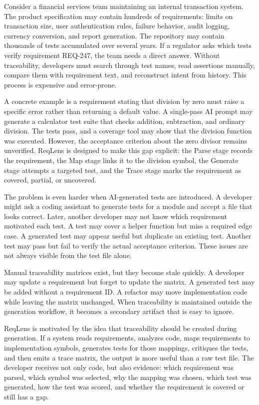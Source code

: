 \documentclass[conference]{IEEEtran}
\begin{document}
Consider a financial services team maintaining an internal transaction system.
The product specification may contain hundreds of requirements: limits on
transaction size, user authentication rules, failure behavior, audit logging,
currency conversion, and report generation. The repository may contain
thousands of tests accumulated over several years. If a regulator asks which
tests verify requirement REQ-247, the team needs a direct answer. Without
traceability, developers must search through test names, read assertions
manually, compare them with requirement text, and reconstruct intent from
history. This process is expensive and error-prone.

A concrete example is a requirement stating that division by zero must raise a
specific error rather than returning a default value. A single-pass AI prompt
may generate a calculator test suite that checks addition, subtraction, and
ordinary division. The tests pass, and a coverage tool may show that the
division function was executed. However, the acceptance criterion about the
zero divisor remains unverified. ReqLens is designed to make this gap explicit:
the Parse stage records the requirement, the Map stage links it to the
division symbol, the Generate stage attempts a targeted test, and the Trace
stage marks the requirement as covered, partial, or uncovered.

The problem is even harder when AI-generated tests are introduced. A developer
might ask a coding assistant to generate tests for a module and accept a file
that looks correct. Later, another developer may not know which requirement
motivated each test. A test may cover a helper function but miss a required
edge case. A generated test may appear useful but duplicate an existing test.
Another test may pass but fail to verify the actual acceptance criterion. These
issues are not always visible from the test file alone.

Manual traceability matrices exist, but they become stale quickly. A developer
may update a requirement but forget to update the matrix. A generated test may
be added without a requirement ID. A refactor may move implementation code while
leaving the matrix unchanged. When traceability is maintained outside the
generation workflow, it becomes a secondary artifact that is easy to ignore.

ReqLens is motivated by the idea that traceability should be created during
generation. If a system reads requirements, analyzes code, maps requirements to
implementation symbols, generates tests for those mappings, critiques the
tests, and then emits a trace matrix, the output is more useful than a raw test
file. The developer receives not only code, but also evidence: which
requirement was parsed, which symbol was selected, why the mapping was chosen,
which test was generated, how the test was scored, and whether the requirement
is covered or still has a gap.
\end{document}
